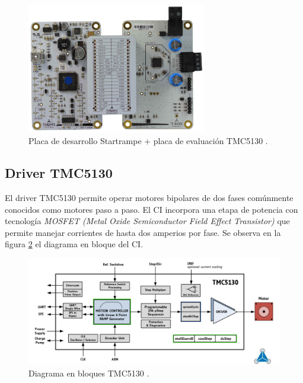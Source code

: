 \begin{figure}[htpb]
\centering 
\includegraphics[width=0.7\textwidth]{./Figures/tmc5130_placa_v2.jpg}
\caption{Placa de desarrollo Startrampe + placa de evaluación TMC5130 \protect\footnotemark.}
\label{fig:tmc5130_placa}
\end{figure}



  
\subsection{Driver TMC5130}
\label{subsection:Driver TMC5130}
El driver TMC5130 permite operar motores bipolares de dos fases comúnmente conocidos como motores paso a paso. El CI incorpora una etapa de potencia con tecnología \textit{MOSFET (Metal Oxide Semiconductor Field Effect Transistor)}  que permite manejar corrientes de hasta dos amperios por fase. Se observa en la figura \ref{fig:tmc5130_diagrama} el diagrama en bloque del CI.

\begin{figure}[htpb]
\centering 
\includegraphics[width=1.1\textwidth]{./Figures/tmc5130_diagrama.png}
\caption{Diagrama en bloques TMC5130 \protect\footnotemark.}
\label{fig:tmc5130_diagrama}
\end{figure}

